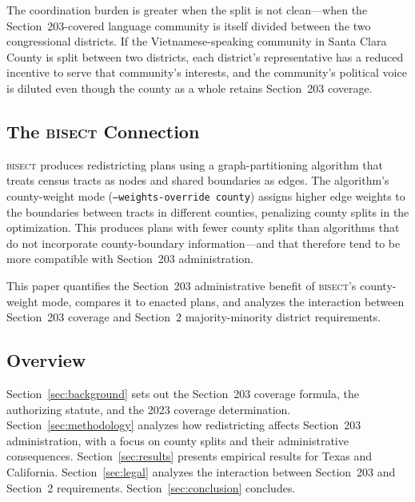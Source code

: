 The coordination burden is greater when the split is not clean---when
the Section~203-covered language community is itself divided between
the two congressional districts. If the Vietnamese-speaking community
in Santa Clara County is split between two districts, each district's
representative has a reduced incentive to serve that community's
interests, and the community's political voice is diluted even though
the county as a whole retains Section~203 coverage.

\subsection{The \textsc{bisect} Connection}

\textsc{bisect} produces redistricting plans using a graph-partitioning
algorithm that treats census tracts as nodes and shared boundaries as
edges. The algorithm's county-weight mode (\texttt{--weights-override county})
assigns higher edge weights to the boundaries between tracts in different
counties, penalizing county splits in the optimization. This produces
plans with fewer county splits than algorithms that do not incorporate
county-boundary information---and that therefore tend to be more compatible
with Section~203 administration.

This paper quantifies the Section~203 administrative benefit of
\textsc{bisect}'s county-weight mode, compares it to enacted plans, and
analyzes the interaction between Section~203 coverage and Section~2
majority-minority district requirements.

\subsection{Overview}

Section~\ref{sec:background} sets out the Section~203 coverage formula,
the authorizing statute, and the 2023 coverage determination.
Section~\ref{sec:methodology} analyzes how redistricting affects
Section~203 administration, with a focus on county splits and their
administrative consequences. Section~\ref{sec:results} presents
empirical results for Texas and California.
Section~\ref{sec:legal} analyzes the interaction between Section~203
and Section~2 requirements. Section~\ref{sec:conclusion} concludes.
